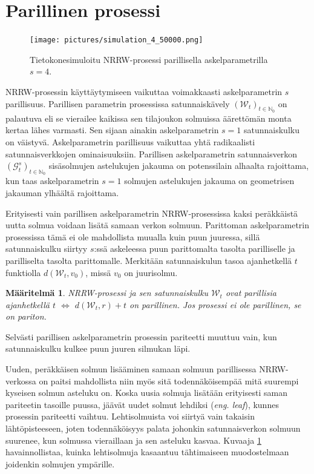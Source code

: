 \documentclass[finnish, 12pt, a4paper, sci, utf8, pdfa]{aaltothesis}
\newcommand{\N}{\mathbb{N}}
\newcommand{\Grandom}{\mathcal{G}}
\newcommand{\Wrandom}{\mathcal{W}}
\newtheorem{definition}{Määritelmä}
\begin{document}
\section{Parillinen prosessi}

\begin{figure}[htb]
\centering
\texttt{[image: pictures/simulation\_4\_50000.png]}
   \caption{Tietokonesimuloitu NRRW-prosessi parillisella askelparametrilla $ s = 4 $. \label{figure:oma_simulaatio}}
\end{figure}

NRRW-prosessin käyttäytymiseen vaikuttaa voimakkaasti askelparametrin $ s $ parillisuus. Parillisen parametrin prosessissa satunnaiskävely $ (\Wrandom_{t})_{t \in \N_{0}} $ on palautuva eli se vierailee kaikissa sen tilajoukon solmuissa äärettömän monta kertaa lähes varmasti. Sen sijaan ainakin askelparametrin $ s = 1 $ satunnaiskulku on väistyvä. Askelparametrin parillisuus vaikuttaa yhtä radikaalisti satunnaisverkkojen ominaisuuksiin. Parillisen askelparametrin satunnaisverkon $ (\Grandom^{s}_{t})_{t \in \N_{0}} $ sisäsolmujen astelukujen jakauma on potenssilain alhaalta rajoittama, kun taas askelparametrin $ s = 1 $ solmujen astelukujen jakauma on geometrisen jakauman ylhäältä rajoittama.

Erityisesti vain parillisen askelparametrin NRRW-prosessissa kaksi peräkkäistä uutta solmua voidaan lisätä samaan verkon solmuun. Parittoman askelparametrin prosessissa tämä ei ole mahdollista muualla kuin puun juuressa, sillä satunnaiskulku siirtyy $ s $:ssä askeleessa puun parittomalta tasolta parilliselle ja parilliselta tasolta parittomalle. Merkitään satunnaiskulun tasoa ajanhetkellä $ t $ funktiolla $ d(\Wrandom_{t}, v_{0}) $, missä $ v_{0} $ on juurisolmu.
\begin{definition}
NRRW-prosessi ja sen satunnaiskulku $ \Wrandom_{t} $ ovat parillisia ajanhetkellä $ t $ $ \Leftrightarrow $ $ d(\Wrandom_{t}, r) + t $ on parillinen. Jos prosessi ei ole parillinen, se on pariton.
\label{definition:parity}
\end{definition}
Selvästi parillisen askelparametrin prosessin pariteetti muuttuu vain, kun satunnaiskulku kulkee puun juuren silmukan läpi.

Uuden, peräkkäisen solmun lisääminen samaan solmuun parillisessa NRRW-verkossa on paitsi mahdollista niin myös sitä todennäköisempää mitä suurempi kyseisen solmun asteluku on. Koska uusia solmuja lisätään erityisesti saman pariteetin tasoille puussa, jäävät uudet solmut lehdiksi (\textit{eng. leaf}), kunnes prosessin pariteetti vaihtuu. Lehtisolmuista voi siirtyä vain takaisin lähtöpisteeseen, joten todennäköisyys palata johonkin satunnaisverkon solmuun suurenee, kun solmussa vieraillaan ja sen asteluku kasvaa. Kuvaaja \ref{figure:oma_simulaatio} havainnollistaa, kuinka lehtisolmuja kasaantuu tähtimaiseen muodostelmaan joidenkin solmujen ympärille.
\end{document}
